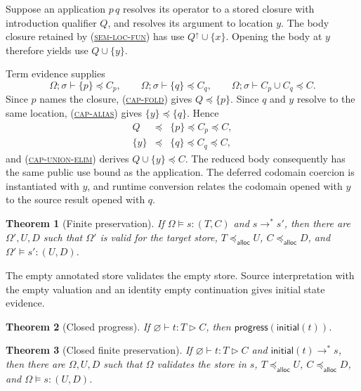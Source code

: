 \documentclass[acmsmall,screen,nonacm]{acmart}
\newtheorem{theorem}{Theorem}
\newcommand{\ruleref}[1]{%
  \textsc{(\hyperref[rule:#1]{#1})}}
\newcommand{\ctxempty}{\varnothing}
\newcommand{\cset}[1]{\{#1\}}
\newcommand{\uses}{\mathbin{\triangleright}}
\newcommand{\steps}{\longrightarrow^{*}}
\newcommand{\extends}{\mathrel{\preccurlyeq_{\mathsf{alloc}}}}
\newcommand{\semleq}{\mathrel{\preceq}}
\begin{document}
Suppose an application \(p\,q\) resolves its operator to a stored closure
with introduction qualifier \(Q\), and resolves its argument to location
\(y\).  The body closure retained by \ruleref{sem-loc-fun} has use
\(Q^\uparrow\cup\cset x\).  Opening the body at \(y\) therefore yields use
\(Q\cup\cset y\).

Term evidence supplies
\[
 \Omega;\sigma\vdash\cset p\semleq C_p,
 \qquad
 \Omega;\sigma\vdash\cset q\semleq C_q,
 \qquad
 \Omega;\sigma\vdash C_p\cup C_q\semleq C.
\]
Since \(p\) names the closure, \ruleref{cap-fold} gives
\(Q\semleq\cset p\).  Since \(q\) and \(y\) resolve to the same location,
\ruleref{cap-alias} gives \(\cset y\semleq\cset q\).  Hence
\[
\begin{array}{rcl}
 Q &\semleq& \cset p\semleq C_p\semleq C,
 \\
 \cset y &\semleq& \cset q\semleq C_q\semleq C,
\end{array}
\]
and \ruleref{cap-union-elim} derives
\(Q\cup\cset y\semleq C\).  The reduced body consequently has the same
public use bound as the application.  The deferred codomain coercion is
instantiated with \(y\), and runtime conversion relates the codomain opened
with \(y\) to the source result opened with \(q\).

\begin{theorem}[Finite preservation]
\label{thm:finite-preservation}
If \(\Omega\models s:(T,C)\) and \(s\steps s'\), then there are
\(\Omega',U,D\) such that \(\Omega'\) is valid for the target store,
\(T\extends U\), \(C\extends D\), and
\(\Omega'\models s':(U,D)\).
\end{theorem}

The empty annotated store validates the empty store.  Source interpretation
with the empty valuation and an identity empty continuation gives initial
state evidence.

\begin{theorem}[Closed progress]
\label{thm:closed-progress}
If \(\ctxempty\vdash t:T\uses C\), then
\(\mathsf{progress}(\mathsf{initial}(t))\).
\end{theorem}

\begin{theorem}[Closed finite preservation]
\label{thm:closed-preservation}
If \(\ctxempty\vdash t:T\uses C\) and
\(\mathsf{initial}(t)\steps s\), then there are
\(\Omega,U,D\) such that \(\Omega\) validates the store in \(s\),
\(T\extends U\), \(C\extends D\), and
\(\Omega\models s:(U,D)\).
\end{theorem}
\end{document}

